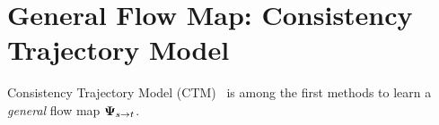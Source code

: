         
        
        
        








\clearpage
\newpage

\section{\texorpdfstring{General Flow Map: Consistency Trajectory Model}{General Flow Map: Consistency Trajectory Model}}\label{sec:CTM}

Consistency Trajectory Model (CTM)~\citep{kim2023consistency} is among the first methods to learn a \emph{general} flow map ${\bm{\Psi}}_{s\to t}$.



